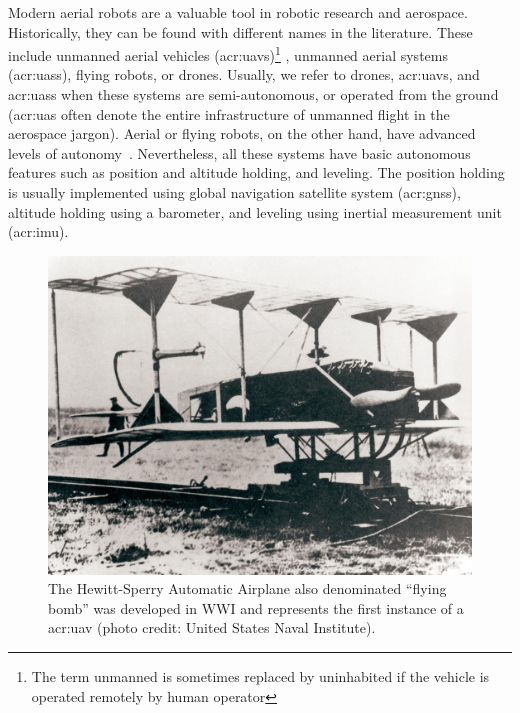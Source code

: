Modern aerial robots are a valuable tool in robotic research and aerospace. Historically, they can be found with different names in the literature. These include unmanned aerial vehicles (\Gls{acr:uav}s)\footnote{The term unmanned is sometimes replaced by uninhabited if the vehicle is operated remotely by human operator}%
, unmanned aerial systems (\Gls{acr:uas}s), flying robots, or drones. Usually, we refer to drones, \Gls{acr:uav}s, and \Gls{acr:uas}s when these systems are semi-autonomous, or operated from the ground (\Gls{acr:uas} often denote the entire infrastructure of unmanned flight in the aerospace jargon). Aerial or flying robots, on the other hand, have advanced levels of autonomy~\citep{siciliano2016springer}. Nevertheless, all these systems have basic autonomous features such as position and altitude holding, and leveling. The position holding is usually implemented using global navigation satellite system (\Gls{acr:gnss}), altitude holding using a barometer, and leveling using inertial measurement unit (\Gls{acr:imu}).

\begin{figure}[t]
  \centering
  \includegraphics[width=.7\textwidth]{pictures/HA-NH-JA-19_1}
  \caption[The Hewitt-Sperry Automatic Airplane]{The Hewitt-Sperry Automatic Airplane also denominated ``flying bomb'' was developed in WWI and represents the first instance of a \Gls{acr:uav} {\scriptsize(photo credit: United States Naval Institute)}.}   
  \label{fig:hewitt-sperry}
\end{figure}

